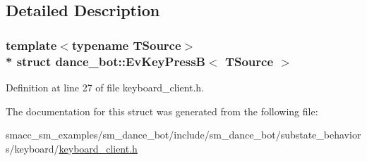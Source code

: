 \subsection{Detailed Description}
\subsubsection*{template$<$typename T\+Source$>$\\*
struct dance\+\_\+bot\+::\+Ev\+Key\+Press\+B$<$ T\+Source $>$}



Definition at line 27 of file keyboard\+\_\+client.\+h.



The documentation for this struct was generated from the following file\+:\begin{DoxyCompactItemize}
\item 
smacc\+\_\+sm\+\_\+examples/sm\+\_\+dance\+\_\+bot/include/sm\+\_\+dance\+\_\+bot/substate\+\_\+behaviors/keyboard/\hyperlink{keyboard__client_8h}{keyboard\+\_\+client.\+h}\end{DoxyCompactItemize}
